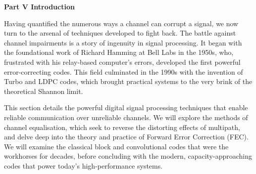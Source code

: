 \newpage
\thispagestyle{empty}

\vspace*{3cm}

\begin{center}
{\Large\lorettadisplay\bfseries Part V Introduction}
\end{center}

\vspace{2cm}

Having quantified the numerous ways a channel can corrupt a signal, we now turn to the arsenal of techniques developed to fight back. The battle against channel impairments is a story of ingenuity in signal processing. It began with the foundational work of Richard Hamming at Bell Labs in the 1950s, who, frustrated with his relay-based computer's errors, developed the first powerful error-correcting codes. This field culminated in the 1990s with the invention of Turbo and LDPC codes, which brought practical systems to the very brink of the theoretical Shannon limit.

\vspace{1em}

This section details the powerful digital signal processing techniques that enable reliable communication over unreliable channels. We will explore the methods of channel equalisation, which seek to reverse the distorting effects of multipath, and delve deep into the theory and practice of Forward Error Correction (FEC). We will examine the classical block and convolutional codes that were the workhorses for decades, before concluding with the modern, capacity-approaching codes that power today's high-performance systems.

\vspace*{\fill}
\newpage
